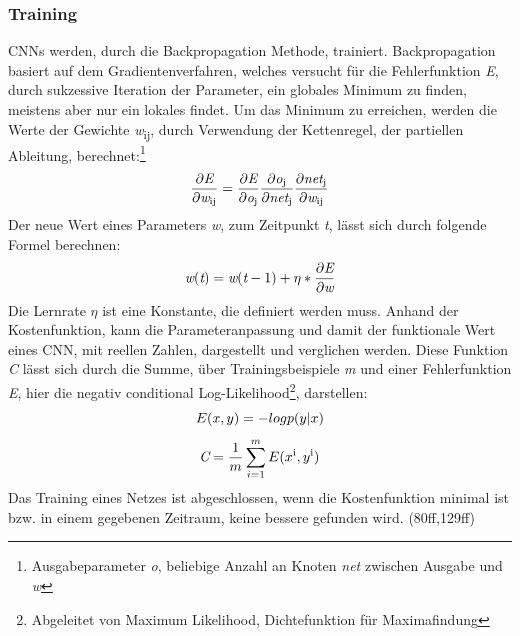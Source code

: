 \documentclass[twosided,a4,10pt]{article}
\begin{document}
\begin{multicols}{2}
		\subsubsection{Training}
		CNNs werden, durch die Backpropagation Methode, trainiert. Backpropagation basiert auf dem Gradientenverfahren, welches versucht für die Fehlerfunktion \textit{E}, durch sukzessive Iteration der Parameter, ein globales Minimum zu finden, meistens aber nur ein lokales findet. Um das Minimum zu erreichen, werden die Werte der Gewichte \textit{w}\textsubscript{ij}, durch Verwendung der Kettenregel, der partiellen Ableitung, berechnet:\footnote[12]{Ausgabeparameter \textit{o}, beliebige Anzahl an Knoten \textit{net} zwischen Ausgabe und \textit{w}}
		\begin{equation*}
		\centering
		\frac{\partial\textit{E}}{\partial\textit{w}\textsubscript{ij}} = \frac{\partial\textit{E}}{\partial\textit{o}\textsubscript{j}} \frac{\partial\textit{o}\textsubscript{j}}{\partial\textit{net}\textsubscript{j}}  \frac{\partial\textit{net}\textsubscript{j}}{\partial\textit{w}\textsubscript{ij}} 
		\end{equation*}\newline
		Der neue Wert eines Parameters \textit{w}, zum Zeitpunkt \textit{t}, lässt sich durch folgende Formel berechnen:
		\begin{equation*}
		\centering
		\textit{w}(\textit{t}) = \textit{w}(\textit{t}-1) + \eta * \frac{\partial\textit{E}}{\partial\textit{w}} 
		\end{equation*}
		Die Lernrate $\eta$ ist eine Konstante, die definiert werden muss.\newline
		Anhand der Kostenfunktion, kann die Parameteranpassung und damit der funktionale Wert eines CNN, mit reellen Zahlen, dargestellt und verglichen werden. Diese Funktion \textit{C} lässt sich durch die Summe, über Trainingsbeispiele \textit{m} und einer Fehlerfunktion \textit{E}, hier die negativ conditional Log-Likelihood\footnote[13]{Abgeleitet von Maximum Likelihood, Dichtefunktion für Maximafindung}, darstellen: 
		\begin{equation*}
			\centering
			E(x,y) = -log p(y|x)
		\end{equation*}
		\begin{equation*}
			\centering
			\textit{C} = \frac{1}{m}\sum_{i=1}^{m}E(x\textsuperscript{i},y\textsuperscript{i})
		\end{equation*}
		Das Training eines Netzes ist abgeschlossen, wenn die Kostenfunktion minimal ist bzw. in einem gegebenen Zeitraum, keine bessere gefunden wird. \cite{goodfellow}(80ff,129ff)

\end{multicols}
\end{document}
